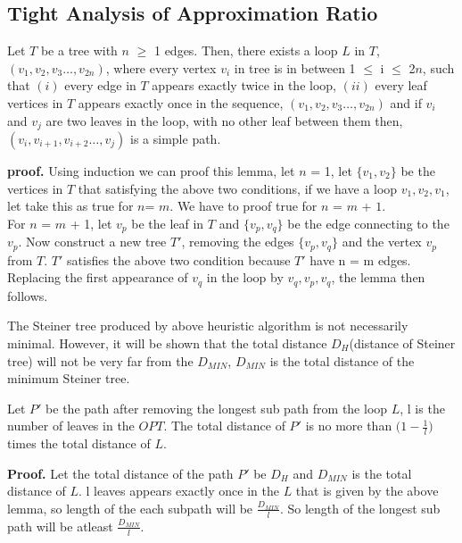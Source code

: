 \subsection{Tight Analysis of Approximation Ratio}

\begin{lemma} \label{hitsel}
Let $T$ be a tree with $n$ $\geq$ 1 edges. Then, there exists a loop $L$ in $T$, $(v_1,v_2,v_3 \dots, v_{2n})$, where every vertex $v_i$ in tree is in between 1 $\leq$ i $\leq$ 2$n$, such that $(i)$ every edge in $T$ appears exactly twice in the loop, $(ii)$ every leaf vertices in $T$ appears exactly once in the sequence, $(v_1,v_2,v_3 \dots, v_{2n})$ and if $v_i$ and $v_j$ are two leaves in the loop, with no other leaf between them then, $(v_i,v_{i+1},v_{i+2} \dots, v_j)$ is a simple path.
\end{lemma}

\textbf{proof.} Using induction we can proof this lemma, let $n$ = 1, let $\{v_1,v_2 \}$ be the vertices in $T$ that satisfying the above two conditions, if we have a loop $v_1 , v_2, v_1$, let take this as true for $n$= $m$. We have to proof true for $n$ = $m$ + $1$.\\
For $n$ = $m$ + 1, let $v_p$ be the leaf in $T$ and $\{v_p,v_q\}$ be the edge connecting to the $v_p$. Now construct a new tree $T'$, removing the edges $\{v_p,v_q\}$ and the vertex $v_p$ from $T$. $T'$ satisfies the above two condition because $T'$ have n = m edges. Replacing the first appearance of $v_q$ in the loop by $v_q, v_p, v_q$, the lemma then follows.

The Steiner tree produced by above heuristic algorithm is not necessarily minimal. However, it will be shown that the total distance $D_H$(distance of Steiner tree) will not be very far from the $D_{MIN}$, $D_{MIN}$ is the total distance of the minimum Steiner tree.

\begin{lemma} \label{hitsel}
Let $P'$ be the path after removing the longest sub path from the loop $L$, l is the number of leaves in the $OPT$. The total distance of $P'$ is no more than $\big( 1 - \frac{1}{l}\Big)$ times the total distance of $L$.
\end{lemma}

\textbf{Proof.} Let the total distance of the path $P'$ be $D_H$ and $D_{MIN}$ is the total distance of $L$. l leaves appears exactly once in the $L$ that is given by the above lemma, so length of the each subpath will be $\frac{D_{MIN}}{l}$. So length of the longest sub path will be atleast $\frac{D_{MIN}}{l}$.

